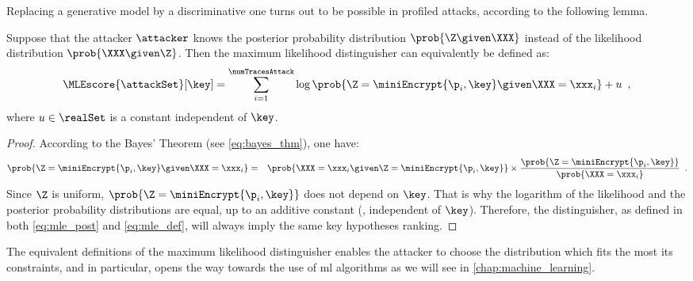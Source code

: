 Replacing a generative model by a discriminative one turns out to be possible in profiled attacks, according to the following lemma.
\begin{lemma}
    \label{lemma:disc_dist}
    Suppose that the attacker \(\attacker\) knows the posterior probability distribution \(\prob{\Z \given \XXX}\) instead of the likelihood distribution \(\prob{\XXX \given \Z}\).
    Then the maximum likelihood distinguisher can equivalently be defined as:
    \begin{equation}
        \MLEscore{\attackSet}[\key] = \sum_{i=1}^{\numTracesAttack} \log{\prob{\Z = \miniEncrypt{\p_i,\key} \given \XXX = \xxx_i}} + u \enspace ,
        \label{eq:mle_post}
    \end{equation}
    where \(u \in \realSet\) is a constant independent of \(\key\).
\end{lemma}
\begin{proof}
    According to the Bayes' Theorem (see \autoref{eq:bayes_thm}), one have:
    \begin{eqnarray}
        \prob{\Z = \miniEncrypt{\p_i,\key} \given \XXX = \xxx_i} & = & \prob{\XXX = \xxx_i \given \Z = \miniEncrypt{\p_i, \key}} \times \frac{\prob{\Z = \miniEncrypt{\p_i,\key}}}{\prob{\XXX = \xxx_i}} \enspace .
        \label{eq:mle_like}
    \end{eqnarray}
    Since \(\Z\) is uniform, \(\prob{\Z = \miniEncrypt{\p_i,\key}}\) does not depend on \(\key\).
    That is why the logarithm of the likelihood and the posterior probability distributions are equal, up to an additive constant (\ie{}, independent of \(\key\)).
    Therefore, the distinguisher, as defined in both \autoref{eq:mle_post} and \autoref{eq:mle_def}, will always imply the same key hypotheses ranking.
\end{proof}
The equivalent definitions of the maximum likelihood distinguisher enables the attacker to choose the distribution which fits the most its constraints, and in particular, opens the way towards the use of \gls{ml} algorithms as we will see in \autoref{chap:machine_learning}.